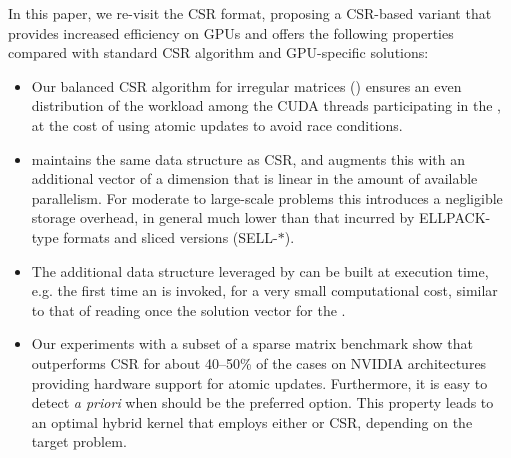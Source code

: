 In this paper, we re-visit the CSR format, proposing a CSR-based \spmv variant
that provides increased efficiency on GPUs
and offers the following properties
compared with standard CSR algorithm and GPU-specific solutions:
\begin{itemize}
\item Our balanced CSR algorithm for irregular matrices (\bcsr)
    ensures an even distribution of the workload among
    the CUDA threads participating in the \spmv,
    at the cost of using atomic updates to avoid race conditions.
\item \bcsr maintains the same data structure as CSR, and augments this with an
    additional vector
    of a dimension that is linear in the amount of available parallelism.
    For moderate to large-scale problems
    this introduces a negligible storage overhead,
    in general much lower than that incurred by ELLPACK-type formats and
    sliced versions (SELL-$*$).
\item The additional data structure leveraged by \bcsr
    can be built at execution time,
    e.g. the first time an \spmv is invoked,
    for a very small computational cost,
    similar to that of reading once the solution vector for the \spmv.
\item Our experiments with a subset of a sparse matrix benchmark show that
    \bcsr outperforms CSR for about 40--50\% of the cases
    on NVIDIA architectures providing hardware support for atomic updates.
    Furthermore, it is easy to detect {\em a priori}
    when \bcsr should be the preferred option. This property
    leads to an optimal hybrid kernel
    that employs either \bcsr or CSR, depending on the target problem.
\end{itemize}
